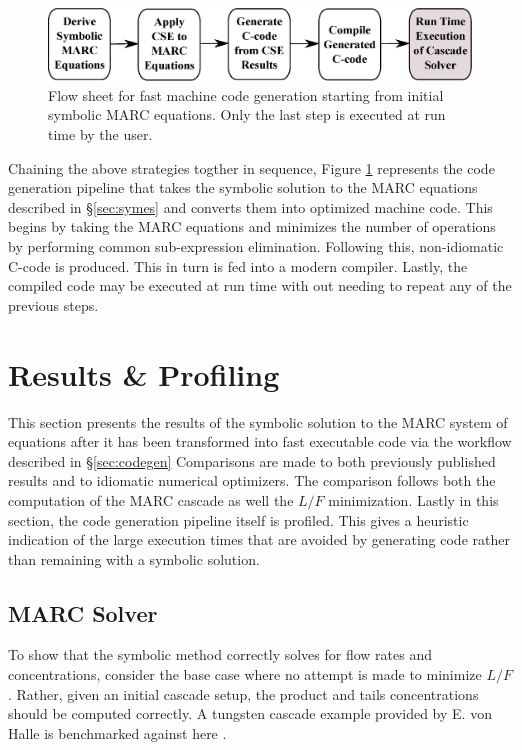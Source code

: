 \documentclass[preprint,12pt]{elsarticle}
\begin{document}
\begin{figure}
\begin{center}
\includegraphics[scale=0.45]{codegen_pipeline.eps}
\caption{Flow sheet for fast machine code generation starting from initial symbolic MARC
equations.  Only the last step is executed at run time by the user.}
\end{center}
\label{codegen_pipeline}
\end{figure}

Chaining the above strategies togther in sequence, Figure \ref{codegen_pipeline} 
represents the 
code generation pipeline that takes the symbolic solution to the MARC equations
described in \S\ref{sec:symes} and converts them into optimized machine code.
This begins by taking the MARC equations and minimizes the number of operations
by performing common sub-expression elimination.  Following this, non-idiomatic
C-code is produced.  This in turn is fed into a modern compiler.  Lastly, the compiled
code may be executed at run time with out needing to repeat any of the previous steps.

\section{Results \& Profiling}
\label{sec:res}

This section presents the results of the symbolic solution to the MARC system 
of equations after it has been transformed into fast executable code via the 
workflow described in \S\ref{sec:codegen}  Comparisons are made to both previously
published results and to idiomatic numerical optimizers.  The 
comparison follows both the computation of the MARC cascade as well the $L/F$ 
minimization. Lastly in this section, the code generation pipeline itself is profiled. 
 This gives a
heuristic indication of the large execution times that are avoided by generating 
code rather than remaining with a symbolic solution.

\subsection{MARC Solver}
\label{sec:l-solver}

To show that the symbolic method correctly solves for flow rates and concentrations,
consider the base case where no attempt is made to minimize $L/F$.  Rather, given 
an initial cascade setup, the product and tails concentrations should be computed 
correctly.  A tungsten cascade example provided by E. von Halle is benchmarked against
here \cite{VonHalle1987}.
\end{document}
